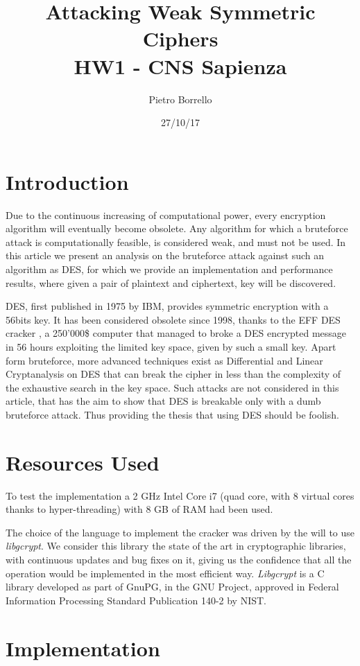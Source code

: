 \documentclass[11pt]{article}
\title{Attacking Weak Symmetric Ciphers \\ \bigskip \large HW1 - CNS Sapienza}
\author{Pietro Borrello}
\date{27/10/17}
\begin{document}
  \maketitle

  \section{Introduction}
  Due to the continuous increasing of computational power, every encryption algorithm will eventually become obsolete.
  Any algorithm for which a bruteforce attack is computationally feasible, is considered weak, and must not be used. In this article we present an analysis on the bruteforce attack against such an algorithm as DES, for which we provide an implementation and performance results, where given a pair of plaintext and ciphertext, key will be discovered.

  DES, first published in 1975 by IBM, provides symmetric encryption with a 56bits key. It has been considered obsolete since 1998, thanks to the EFF DES cracker \cite{descracker}, a 250'000\$ computer that managed to broke a DES encrypted message in 56 hours exploiting the limited key space, given by such a small key. Apart form bruteforce, more advanced techniques exist as Differential and Linear Cryptanalysis on DES \cite{cryptanalysis} that can break the cipher in less than the complexity of the exhaustive search in the key space. Such attacks are not considered in this article, that has the aim to show that DES is breakable only with a dumb bruteforce attack. Thus providing the thesis that using DES should be foolish.

  \section{Resources Used}
  To test the implementation a 2 GHz Intel Core i7 (quad core, with 8 virtual cores thanks to hyper-threading) with 8 GB of RAM had been used.

  The choice of the language to implement the cracker was driven by the will to use \textit{libgcrypt}. We consider this library the state of the art in cryptographic libraries, with continuous updates and bug fixes on it, giving us the confidence that all the operation would be implemented in the most efficient way. \textit{Libgcrypt} is a C library developed as part of GnuPG, in the GNU Project, approved in Federal Information Processing Standard Publication 140-2 by NIST.

  \section{Implementation}
\end{document}
